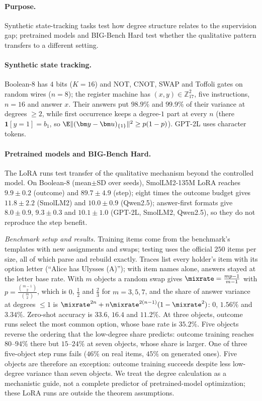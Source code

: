 \paragraph{Purpose.} Synthetic state-tracking tasks test how degree structure relates to the supervision gap;
pretrained models and BIG-Bench Hard test whether the qualitative pattern transfers to a different setting.

\paragraph{Synthetic state tracking.} Boolean-8 has $4$ bits ($K=16$) and NOT, CNOT, SWAP and Toffoli gates on random wires ($n=8$); the register
machine has $(x,y)\in\mathbb Z_{17}^2$, five instructions, $n=16$ and answer $x$. Their answers put $98.9\%$ and $99.9\%$ of their
variance at degrees $\ge2$, while first occurrence keeps a degree-$1$ part at every $n$ (there $\mathbf 1[y=1]=b_1$, so $\E\|(\bm y-\bm u)_{\{1\}}\|^2\ge p(1-p)$). GPT-2L uses character tokens. \paragraph{Pretrained models and BIG-Bench Hard.} The LoRA runs test transfer of the qualitative mechanism beyond the controlled model.
On Boolean-8 (mean$\pm$SD over seeds), SmolLM2-135M LoRA reaches $9.9\pm0.2$ (outcome)
and $89.7\pm4.9$ (step); eight times the outcome budget gives $11.8\pm2.2$ (SmolLM2) and $10.0\pm0.9$ (Qwen2.5); answer-first
formats give $8.0\pm0.9$, $9.3\pm0.3$ and $10.1\pm1.0$ (GPT-2L, SmolLM2, Qwen2.5), so they do not reproduce the step benefit.



\noindent\begin{minipage}{\linewidth}
\emph{Benchmark setup and results.} Training items come from the benchmark's templates with new assignments and swaps; testing uses
the official $250$ items per size, all of which parse and rebuild exactly. Traces list every holder's item with its
option letter (``Alice has Ulysses (A)''); with item names alone, answers stayed at the letter base rate. With $m$
objects a random swap gives $\mixrate=\frac{mp-1}{m-1}$ with $p=\frac{\binom{m-1}{2}}{\binom{m}{2}}$, which is $0$, $\tfrac{1}{2}$ and $\tfrac{2}{3}$ for $m=3,5,7$, and the
share of answer variance at degrees $\le1$ is $\mixrate^{2n}+n\mixrate^{2(n-1)}(1-\mixrate^2)$: $0$, $1.56\%$ and $3.34\%$. Zero-shot accuracy is
$33.6$, $16.4$ and $11.2\%$. At three objects, outcome runs select the most common option, whose base rate is $35.2\%$.
Five objects reverse the ordering that the low-degree share predicts: outcome training reaches $80$--$94\%$ there but
$15$--$24\%$ at seven objects, whose share is larger. One of three five-object step runs fails ($46\%$ on real items, $45\%$ on
generated ones). Five objects are therefore an exception: outcome training succeeds despite less low-degree variance than seven objects.
We treat the degree calculation as a mechanistic guide, not a complete predictor of pretrained-model optimization; these LoRA runs are outside the theorem assumptions.
\end{minipage}





